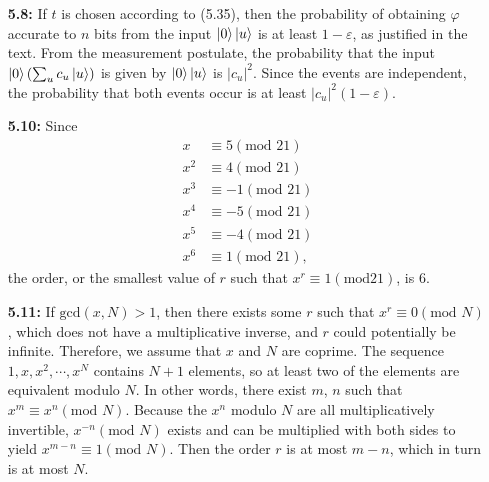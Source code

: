 \documentclass[a4paper,12pt]{article}
\begin{document}
\begin{enumerate}
    \item[\textbf{5.8:}]
        If $t$ is chosen according to (5.35), then the probability of obtaining $\varphi$ accurate to $n$ bits from the input $\ket{0} \ket{u}$ is at least $1 - \varepsilon$, as justified in the text. From the measurement postulate, the probability that the input $\ket{0} (\sum_u c_u \ket{u})$ is given by $\ket{0} \ket{u}$ is $|c_u|^2$. Since the events are independent, the probability that both events occur is at least $|c_u|^2 (1 - \varepsilon)$.

    \item[\textbf{5.10:}]
        Since
        \begin{align*}
            x &\equiv 5 (\text{mod } 21) \\
            x^2 &\equiv 4 (\text{mod } 21) \\
            x^3 &\equiv -1 (\text{mod } 21) \\
            x^4 &\equiv -5 (\text{mod } 21) \\
            x^5 &\equiv -4 (\text{mod } 21) \\
            x^6 &\equiv 1 (\text{mod } 21),
        \end{align*}
        the order, or the smallest value of $r$ such that $x^r \equiv 1 (\text{mod} 21)$, is $6$.

    \item[\textbf{5.11:}]
        If $\text{gcd}(x, N) > 1$, then there exists some $r$ such that $x^r \equiv 0 (\text{mod } N)$, which does not have a multiplicative inverse, and $r$ could potentially be infinite. Therefore, we assume that $x$ and $N$ are coprime. The sequence $1, x, x^2, \cdots, x^N$ contains $N + 1$ elements, so at least two of the elements are equivalent modulo $N$. In other words, there exist $m$, $n$ such that $x^m \equiv x^n (\text{mod } N)$. Because the $x^n$ modulo $N$ are all multiplicatively invertible, $x^{-n} (\text{mod } N)$ exists and can be multiplied with both sides to yield $x^{m - n} \equiv 1 (\text{mod } N)$. Then the order $r$ is at most $m - n$, which in turn is at most $N$.


\end{enumerate}
\end{document}
